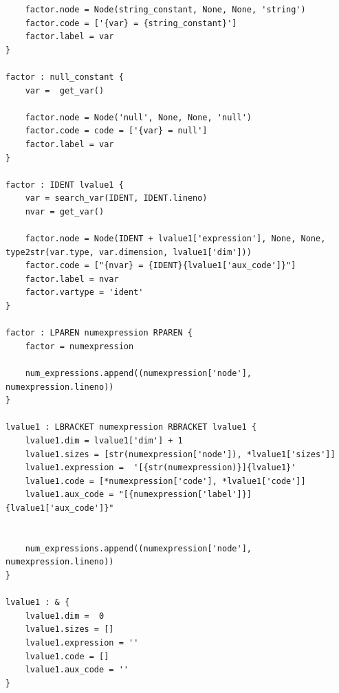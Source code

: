 \documentclass[
	12pt,				%
	openright,			%
	twoside,			%
	a4paper,			%
	english,			%
	french,				%
	spanish,			%
	brazil				%
	]{abntex2}
\begin{document}
\begin{apendicesenv}
\begin{lstlisting}
    factor.node = Node(string_constant, None, None, 'string')
    factor.code = ['{var} = {string_constant}']
    factor.label = var
}

factor : null_constant {
    var =  get_var() 

    factor.node = Node('null', None, None, 'null')
    factor.code = code = ['{var} = null']
    factor.label = var
}

factor : IDENT lvalue1 {
    var = search_var(IDENT, IDENT.lineno)
    nvar = get_var()

    factor.node = Node(IDENT + lvalue1['expression'], None, None, type2str(var.type, var.dimension, lvalue1['dim']))
    factor.code = ["{nvar} = {IDENT}{lvalue1['aux_code']}"]
    factor.label = nvar
    factor.vartype = 'ident'
}

factor : LPAREN numexpression RPAREN {
    factor = numexpression

    num_expressions.append((numexpression['node'], numexpression.lineno))
}

lvalue1 : LBRACKET numexpression RBRACKET lvalue1 {
    lvalue1.dim = lvalue1['dim'] + 1
    lvalue1.sizes = [str(numexpression['node']), *lvalue1['sizes']]
    lvalue1.expression =  '[{str(numexpression)}]{lvalue1}'
    lvalue1.code = [*numexpression['code'], *lvalue1['code']]
    lvalue1.aux_code = "[{numexpression['label']}]{lvalue1['aux_code']}"


    num_expressions.append((numexpression['node'], numexpression.lineno))
}

lvalue1 : & {
    lvalue1.dim =  0
    lvalue1.sizes = []
    lvalue1.expression = ''
    lvalue1.code = []
    lvalue1.aux_code = ''
}
\end{lstlisting}
\end{apendicesenv}



%
%

\printindex
\end{document}
